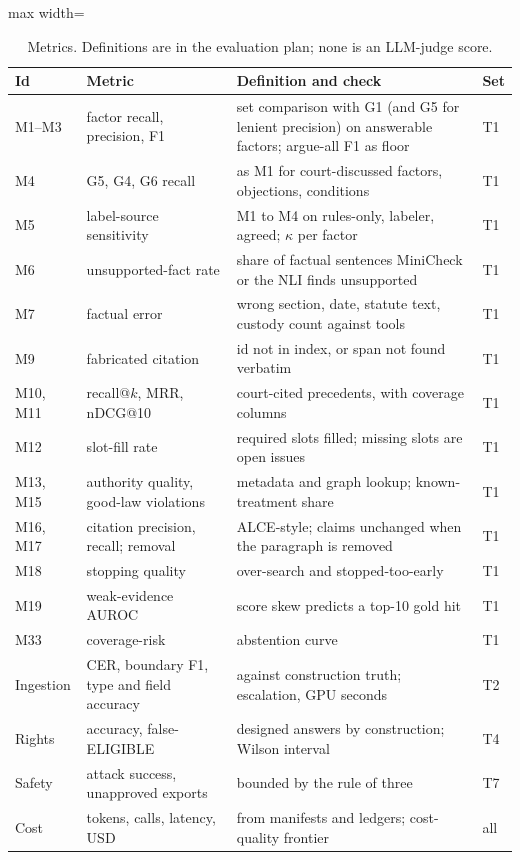 \begin{table}[H]
\centering\small
\begin{adjustbox}{max width=\textwidth}
\begin{tabular}{@{}llp{6.2cm}l@{}}
\toprule
Id & Metric & Definition and check & Set \\
\midrule
M1--M3 & factor recall, precision, F1 & set comparison with G1 (and G5 for lenient precision) on answerable factors; argue-all F1 as floor & T1 \\
M4 & G5, G4, G6 recall & as M1 for court-discussed factors, objections, conditions & T1 \\
M5 & label-source sensitivity & M1 to M4 on rules-only, labeler, agreed; $\kappa$ per factor & T1 \\
M6 & unsupported-fact rate & share of factual sentences MiniCheck or the NLI finds unsupported & T1 \\
M7 & factual error & wrong section, date, statute text, custody count against tools & T1 \\
M9 & fabricated citation & id not in index, or span not found verbatim & T1 \\
M10, M11 & recall@$k$, MRR, nDCG@10 & court-cited precedents, with coverage columns & T1 \\
M12 & slot-fill rate & required slots filled; missing slots are open issues & T1 \\
M13, M15 & authority quality, good-law violations & metadata and graph lookup; known-treatment share & T1 \\
M16, M17 & citation precision, recall; removal & ALCE-style; claims unchanged when the paragraph is removed & T1 \\
M18 & stopping quality & over-search and stopped-too-early & T1 \\
M19 & weak-evidence AUROC & score skew predicts a top-10 gold hit & T1 \\
M33 & coverage-risk & abstention curve & T1 \\
Ingestion & CER, boundary F1, type and field accuracy & against construction truth; escalation, GPU seconds & T2 \\
Rights & accuracy, false-ELIGIBLE & designed answers by construction; Wilson interval & T4 \\
Safety & attack success, unapproved exports & bounded by the rule of three & T7 \\
Cost & tokens, calls, latency, USD & from manifests and ledgers; cost-quality frontier & all \\
\bottomrule
\end{tabular}
\end{adjustbox}
\caption{Metrics. Definitions are in the evaluation plan; none is an LLM-judge score.}
\end{table}

